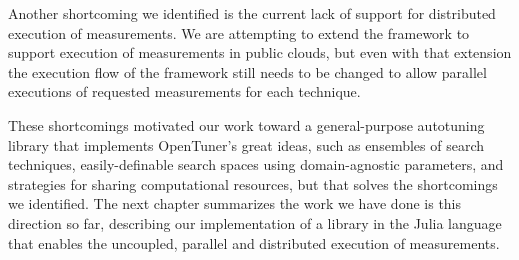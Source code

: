 Another shortcoming we identified is the current lack of support for
distributed execution of measurements. We are attempting to extend the
framework to support execution of measurements in public clouds, but even with
that extension the execution flow of the framework still needs to be changed to
allow parallel executions of requested measurements for each technique.

These shortcomings motivated our work toward a general-purpose autotuning
library that implements OpenTuner's great ideas, such as ensembles of
search techniques, easily-definable search spaces using domain-agnostic
parameters, and strategies for sharing computational resources, but that solves
the shortcomings we identified. The next chapter summarizes the work
we have done is this direction so far, describing our implementation of
a library in the Julia language that enables the uncoupled, parallel
and distributed execution of measurements.
